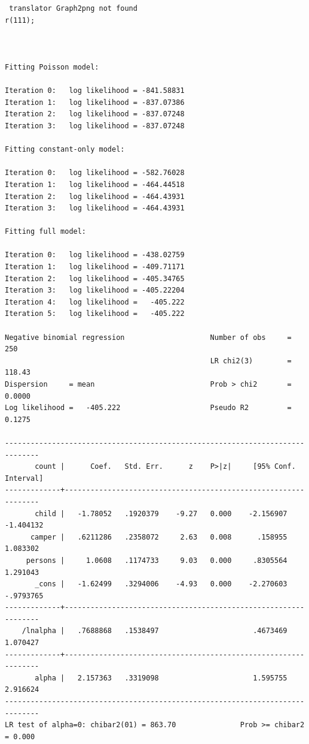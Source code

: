 \documentclass[]{book}
\begin{document}
\begin{verbatim}
 translator Graph2png not found
r(111);



Fitting Poisson model:

Iteration 0:   log likelihood = -841.58831  
Iteration 1:   log likelihood = -837.07386  
Iteration 2:   log likelihood = -837.07248  
Iteration 3:   log likelihood = -837.07248  

Fitting constant-only model:

Iteration 0:   log likelihood = -582.76028  
Iteration 1:   log likelihood = -464.44518  
Iteration 2:   log likelihood = -464.43931  
Iteration 3:   log likelihood = -464.43931  

Fitting full model:

Iteration 0:   log likelihood = -438.02759  
Iteration 1:   log likelihood = -409.71171  
Iteration 2:   log likelihood = -405.34765  
Iteration 3:   log likelihood = -405.22204  
Iteration 4:   log likelihood =   -405.222  
Iteration 5:   log likelihood =   -405.222  

Negative binomial regression                    Number of obs     =        250
                                                LR chi2(3)        =     118.43
Dispersion     = mean                           Prob > chi2       =     0.0000
Log likelihood =   -405.222                     Pseudo R2         =     0.1275

------------------------------------------------------------------------------
       count |      Coef.   Std. Err.      z    P>|z|     [95% Conf. Interval]
-------------+----------------------------------------------------------------
       child |   -1.78052   .1920379    -9.27   0.000    -2.156907   -1.404132
      camper |   .6211286   .2358072     2.63   0.008      .158955    1.083302
     persons |     1.0608   .1174733     9.03   0.000     .8305564    1.291043
       _cons |   -1.62499   .3294006    -4.93   0.000    -2.270603   -.9793765
-------------+----------------------------------------------------------------
    /lnalpha |   .7688868   .1538497                      .4673469    1.070427
-------------+----------------------------------------------------------------
       alpha |   2.157363   .3319098                      1.595755    2.916624
------------------------------------------------------------------------------
LR test of alpha=0: chibar2(01) = 863.70               Prob >= chibar2 = 0.000
\end{verbatim}
\end{document}
